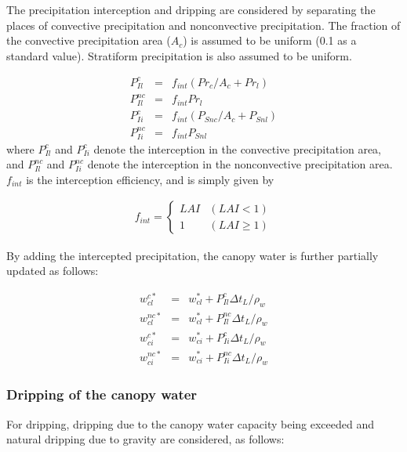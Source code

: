 The precipitation interception and dripping are considered by separating the places of convective precipitation and nonconvective precipitation. The fraction of the convective precipitation area
(\(A_c\)) is assumed to be uniform (0.1 as a standard value). Stratiform precipitation is also assumed to be uniform.

\begin{eqnarray}
 P_{Il}^{c}  &=& f_{int} ( Pr_c / A_c + Pr_l ) \\
 P_{Il}^{nc} &=& f_{int} Pr_l \\
 P_{Ii}^{c}  &=& f_{int} ( P_{Snc} / A_c + P_{Snl} ) \\
 P_{Ii}^{nc} &=& f_{int} P_{Snl}
\end{eqnarray} where \(P_{Il}^{c}\) and \(P_{Ii}^{c}\) denote the interception in the convective precipitation area, and \(P_{Il}^{nc}\) and \(P_{Ii}^{nc}\) denote the interception in the nonconvective
precipitation area. \(f_{int}\) is the interception efficiency, and is simply given by

\begin{eqnarray}
 f_{int} = \left\{
\begin{array}{ll}
 LAI  & (LAI < 1)\\
 1    & (LAI \geq 1)
\end{array}
\right.
\end{eqnarray}

By adding the intercepted precipitation, the canopy water is further partially updated as follows:

\begin{eqnarray}
 w_{cl}^{c*} &=& w_{cl}^\ast  + P_{Il}^c    \Delta t_L / \rho_w \\
 w_{cl}^{nc*}&=& w_{cl}^\ast  + P_{Il}^{nc} \Delta t_L / \rho_w \\
 w_{ci}^{c*} &=& w_{ci}^\ast  + P_{Ii}^c    \Delta t_L / \rho_w \\
 w_{ci}^{nc*}&=& w_{ci}^\ast  + P_{Ii}^{nc} \Delta t_L / \rho_w
\end{eqnarray}

\hypertarget{dripping-of-the-canopy-water}{%
\subsubsection{Dripping of the canopy water}\label{dripping-of-the-canopy-water}}

For dripping, dripping due to the canopy water capacity being exceeded and natural dripping due to gravity are considered, as follows:

